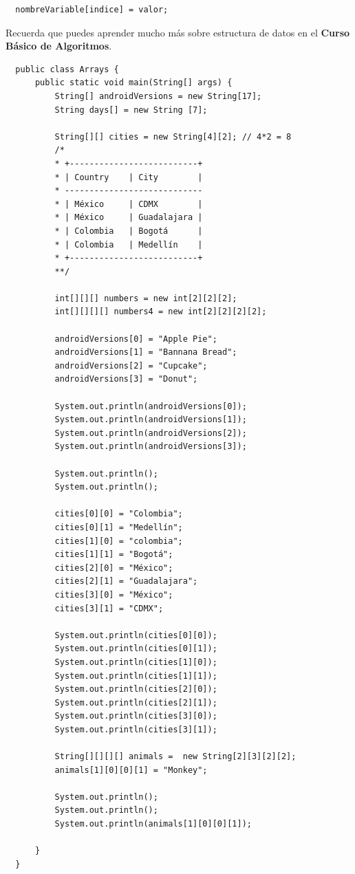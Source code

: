 \documentclass{article}
\begin{document}
\begin{verbatim}
  nombreVariable[indice] = valor;
\end{verbatim}

Recuerda que puedes aprender mucho más sobre estructura de datos en el
\textbf{Curso Básico de Algoritmos}.

\begin{verbatim}
  public class Arrays {
      public static void main(String[] args) {
          String[] androidVersions = new String[17];
          String days[] = new String [7];

          String[][] cities = new String[4][2]; // 4*2 = 8
          /*
          * +--------------------------+
          * | Country    | City        |
          * ----------------------------
          * | México     | CDMX        |
          * | México     | Guadalajara |
          * | Colombia   | Bogotá      |
          * | Colombia   | Medellín    |
          * +--------------------------+
          **/

          int[][][] numbers = new int[2][2][2];
          int[][][][] numbers4 = new int[2][2][2][2];

          androidVersions[0] = "Apple Pie";
          androidVersions[1] = "Bannana Bread";
          androidVersions[2] = "Cupcake";
          androidVersions[3] = "Donut";

          System.out.println(androidVersions[0]);
          System.out.println(androidVersions[1]);
          System.out.println(androidVersions[2]);
          System.out.println(androidVersions[3]);

          System.out.println();
          System.out.println();

          cities[0][0] = "Colombia";
          cities[0][1] = "Medellín";
          cities[1][0] = "colombia";
          cities[1][1] = "Bogotá";
          cities[2][0] = "México";
          cities[2][1] = "Guadalajara";
          cities[3][0] = "México";
          cities[3][1] = "CDMX";

          System.out.println(cities[0][0]);
          System.out.println(cities[0][1]);
          System.out.println(cities[1][0]);
          System.out.println(cities[1][1]);
          System.out.println(cities[2][0]);
          System.out.println(cities[2][1]);
          System.out.println(cities[3][0]);
          System.out.println(cities[3][1]);

          String[][][][] animals =  new String[2][3][2][2];
          animals[1][0][0][1] = "Monkey";

          System.out.println();
          System.out.println();
          System.out.println(animals[1][0][0][1]);

      }
  }
\end{verbatim}
\end{document}
